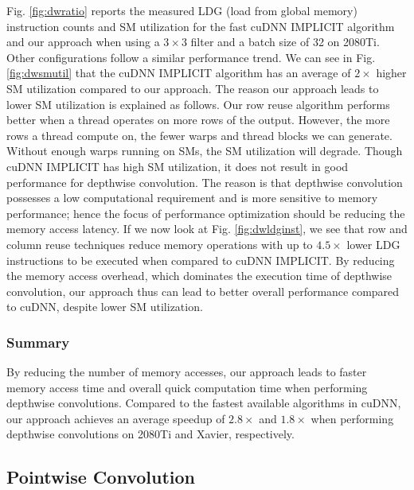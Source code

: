 Fig. \ref{fig:dwratio} reports the measured LDG (load from global memory) instruction counts and SM utilization for the fast cuDNN IMPLICIT
algorithm and our approach when using a $3 \times 3$ filter and a batch size of 32 on 2080Ti. Other configurations follow a similar
performance trend. We can see in Fig. \ref{fig:dwsmutil} that the cuDNN IMPLICIT algorithm has an average of $2\times$ higher SM
utilization compared to our approach. The reason our approach leads to lower SM utilization is explained as follows. Our row reuse
algorithm performs better when a thread operates on more rows of the output. However, the more rows a thread compute on, the fewer warps
and thread blocks we can generate. Without enough warps running on SMs, the SM utilization will degrade. Though cuDNN IMPLICIT has high SM
utilization, it does not result in good performance for depthwise convolution. The reason is that depthwise convolution possesses a low
computational requirement and is more sensitive to memory performance; hence the focus of performance optimization should be reducing the
memory access latency.  If we now look at Fig. \ref{fig:dwldginst}, we see that row and column reuse techniques reduce memory operations
with up to $4.5\times$ lower LDG instructions to be executed when compared to cuDNN IMPLICIT. By reducing the memory access overhead, which
dominates the execution time of depthwise convolution, our approach thus can lead to better overall performance compared to cuDNN, despite
lower SM utilization.

\subsubsection{Summary}
By reducing the number of memory accesses, our approach leads to faster memory access time and overall quick computation time when
performing depthwise convolutions. Compared to the fastest available algorithms in cuDNN, our approach achieves an average speedup of
$2.8\times$ and $1.8\times$ when performing depthwise convolutions on 2080Ti and Xavier, respectively.


\subsection{Pointwise Convolution}
\label{sec:pwconvexp}

